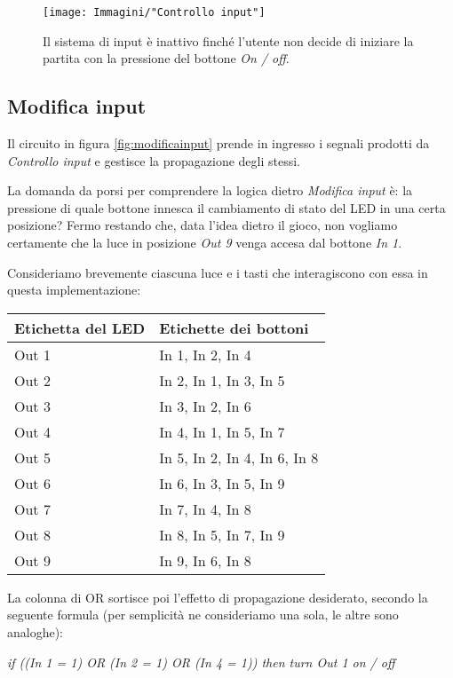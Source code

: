\documentclass[11pt]{article}
\begin{document}
\begin{figure}[H]
\centering
\texttt{[image: Immagini/"Controllo input"]}
\caption{{\small Il sistema di input è inattivo finché l'utente non decide di iniziare la partita con la pressione del bottone {\itshape On / off}.}}
\label{fig:controlloinput}
\end{figure}


\subsection{Modifica input}

Il circuito in figura \underline{\vref{fig:modificainput}} prende in ingresso i segnali prodotti da {\itshape Controllo input} e gestisce la propagazione degli stessi. 

La domanda da porsi per comprendere la logica dietro {\itshape Modifica input} è: la pressione di quale bottone innesca il cambiamento di stato del LED in una certa posizione? Fermo restando che, data l'idea dietro il gioco, non vogliamo certamente che la luce in posizione {\itshape Out 9} venga accesa dal bottone {\itshape In 1}.

Consideriamo brevemente ciascuna luce e i tasti che interagiscono con essa in questa implementazione:

\begin{tabular}{|l|l|}
\hline
Etichetta del LED & Etichette dei bottoni \\
\hline
Out 1 & In 1, In 2, In 4 \\
Out 2 & In 2, In 1, In 3, In 5 \\
Out 3 & In 3, In 2, In 6 \\
Out 4 & In 4, In 1, In 5, In 7 \\
Out 5 & In 5, In 2, In 4, In 6, In 8 \\
Out 6 & In 6, In 3, In 5, In 9 \\
Out 7 & In 7, In 4, In 8 \\
Out 8 & In 8, In 5, In 7, In 9 \\
Out 9 & In 9, In 6, In 8 \\
\hline
\end{tabular}

\hfill

La colonna di OR sortisce poi l'effetto di propagazione desiderato, secondo la seguente formula (per semplicità ne consideriamo una sola, le altre sono analoghe):

{\itshape if ((In 1 = 1) OR (In 2 = 1) OR (In 4 = 1)) then turn Out 1 on / off}
\end{document}
